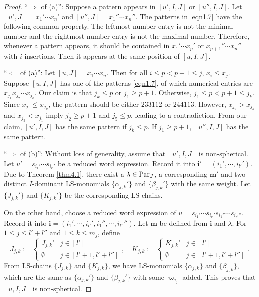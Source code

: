 \documentclass[12pt]{amsart}
\theoremstyle{definition}
\theoremstyle{remark}
\newcommand{\Parj}{{\rm Par}_J}
\begin{document}
\begin{proof}
``$\Rightarrow$ of (a)'': Suppose a pattern appears in $[u',I,J]$ or $[u'',I,J]$. Let $[u',J] = x_1' \cdots x_n'$ and $[u'',J] = x_1'' \cdots x_n''$. The patterns in \eqref{eqn1.7} have the following common property. The leftmost number entry is not the minimal number and the rightmost number entry is not the maximal number. Therefore, whenever a pattern appears, it should be contained in $x_1' \cdots x_p'$ or $x_{p+1}'' \cdots x_n''$ with $i$ insertions. Then it appears at the same position of $[u,I,J]$.

``$\Leftarrow$ of (a)'': Let $[u,J] = x_1 \cdots x_n$. Then for all $i \leq p < p+1 \leq j$, $x_i \leq x_j$. Suppose $[u,I,J]$ has one of the patterns \eqref{eqn1.7}, of which numerical entries are $x_{j_1} x_{j_2} \cdots x_{j_k}$. Our claim is that $j_k \leq p$ or $j_1 \geq p+1$. Otherwise, $j_1 \leq p < p+1 \leq  j_k$. Since $x_{j_1} \leq x_{j_k}$, the pattern should be either $233112$ or $244113$. However, $x_{j_2} > x_{j_k}$ and $x_{j_5} < x_{j_1}$ imply $j_2 \geq p+1$ and $j_5 \leq p$, leading to a contradiction. From our claim, $[u',I,J]$ has the same pattern if $j_k \leq p$. If $j_1\geq p+1$, $[u'',I,J]$ has the same pattern.

``$\Rightarrow$ of (b)'': Without loss of generality, assume that $[u',I,J]$ is non-spherical. Let $u' = s_{i_1'} \cdots s_{i_{l'}'}$ be a reduced word expression. Record it into $\mathbf{i'} = (i_1' , \cdots , i_{l'}')$. Due to Theorem \ref{thm4.1}, there exist a $\lambda \in \Parj$, a corresponding $\mathbf{m'}$ and two distinct $I$-dominant LS-monomials $\{\alpha_{j,k}' \}$ and $\{\beta_{j,k}' \}$ with the same weight. Let $\{ J_{j,k}' \}$ and $\{K_{j,k}'\}$ be the corresponding LS-chains.

On the other hand, choose a reduced word expression of $u = s_{i_1 '} \cdots s_{i_{l'}'} s_{i_1 ''} \cdots s_{i_{l''}''}$. Record it into $\mathbf{i} = (i_1' , \cdots , i_{l'}', i_{1}'', \cdots , i_{l''}'')$. Let $\mathbf{m}$ be defined from $\mathbf{i}$ and $\lambda$. For $1 \leq j \leq l'+l''$ and $1 \leq k \leq m_j$, define
\begin{equation}
J_{j,k} :=
\begin{cases}
J_{j,k}' & j \in [l'] \\
\emptyset & j \in [l'+1 , l'+l'']
\end{cases}
, \quad K_{j,k}:=
\begin{cases}
K_{j,k}' & j \in [l'] \\
\emptyset & j \in [l'+1 , l'+l'']
\end{cases}
.
\end{equation}
From LS-chains $\{J_{j,k} \}$ and $\{K_{j,k}\}$, we have LS-monomials $\{ \alpha_{j,k} \}$ and $\{\beta_{j,k}\}$, which are the same as $\{\alpha_{j,k}' \}$ and $\{\beta_{j,k}' \}$ with some $\varpi_{i_j}$ added. This proves that $[u,I,J]$ is non-spherical.


\end{proof}
\end{document}
